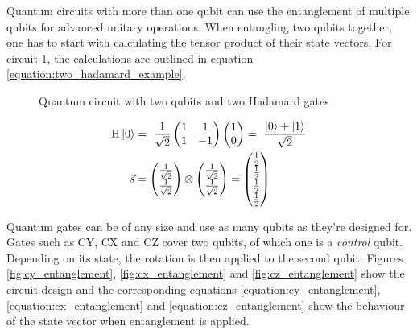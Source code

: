 Quantum circuits with more than one qubit can use the entanglement of multiple qubits for advanced unitary operations. When entangling two qubits together, one has to start with calculating the tensor product of their state vectors. For circuit \ref{fig:circuit_double_hadamard}, the calculations are outlined in equation \ref{equation:two_hadamard_example}.

\begin{figure}[!h]
    \centering
    \caption{Quantum circuit with two qubits and two Hadamard gates}
    \label{fig:circuit_double_hadamard}
\end{figure}

\begin{equation}
    \centering
    \begin{split}
        \mathrm{H}\ket{0} &=\ \frac{1}{\sqrt{2}}\begin{pmatrix}1 & 1 \\1 & -1\end{pmatrix}\begin{pmatrix}1 \\ 0\end{pmatrix} =\ \frac{\ket{0} + \ket{1}}{\sqrt{2}} \\
        \vec{s} &= \begin{pmatrix}\frac{1}{\sqrt{2}}\\\frac{1}{\sqrt{2}}\end{pmatrix} \otimes \begin{pmatrix}\frac{1}{\sqrt{2}}\\\frac{1}{\sqrt{2}}\end{pmatrix} = \begin{pmatrix}
            \frac{1}{2}\\\frac{1}{2}\\\frac{1}{2}\\\frac{1}{2}
        \end{pmatrix}
    \end{split}
    \label{equation:two_hadamard_example}
\end{equation}

\newpage
Quantum gates can be of any size and use as many qubits as they're designed for. Gates such as $\mathrm{CY}$\cite{qiskit_cygate_nodate}, $\mathrm{CX}$\cite{qiskit_cxgate_nodate} and $\mathrm{CZ}$\cite{qiskit_czgate_nodate} cover two qubits, of which one is a \emph{control} qubit. Depending on its state, the rotation is then applied to the second qubit. Figures \ref{fig:cy_entanglement}, \ref{fig:cx_entanglement} and \ref{fig:cz_entanglement} show the circuit design and the corresponding equations \ref{equation:cy_entanglement}, \ref{equation:cx_entanglement} and \ref{equation:cz_entanglement} show the behaviour of the state vector when entanglement is applied.

